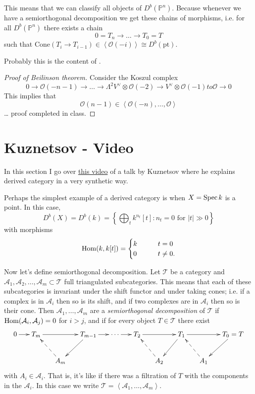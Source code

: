 This means that we can classify all objects
of $D^b(\mathbb{P}^n)$. Because whenever we
have a semiorthogonal decomposition we get
these chains of morphisms, i.e. for all
$D^b(\mathbb{P}^n)$ there exists a chain
$$
0=T_n \to \ldots \to T_0=T
$$
such that $\text{Cone}(T_i \to T_{i-1}) \in
\left\langle{}\mathcal{O}(-i)\right\rangle{} \cong
D^b(\text{pt})$.

Probably this is the content of
\cite{Beilinson-derived}.

\begin{proof}[Proof of Beilinson theorem]
Consider the Koszul complex
$$
0\to \mathcal{O}(-n-1)\to\ldots \to
\Lambda^{2}V^\vee \otimes \mathcal{O}(-2)
\to V^{\vee}\otimes \mathcal{O}(-1) to
\mathcal{O} \to0
$$
This implies that
$$
\mathcal{O}(n-1) \in \left\langle{}
\mathcal{O}(-n),\ldots,\mathcal{O}\right\rangle{}
$$
\ldots{} proof completed in class.
\end{proof}

\section{Kuznetsov - Video}
\label{section-video}

\noindent
In this section I go over
\href{https://www.mathnet.ru/php/
presentation.phtml?option_lang=eng&presentid=
337}{this
video} of a talk by Kuznetsov where he
explains derived category in a very synthetic
way.

\begin{example}
\label{example-simplest-derived-category}
Perhaps the simplest example of a derived
category is when $X=\mathop{\mathrm{Spec}} k$ is a point. In
this case,
$$
D^b(X)=D^b(k)=\left\{\bigoplus_tk^{n_t}[t]:
n_t=0\text{ for }|t|\gg 0\right\}
$$
with morphisms
$$
\mathop{\mathrm{Hom}}\nolimits(k,k[t])
=\begin{cases}
k\qquad &t=0 \\
0\qquad &t\neq 0.
\end{cases}
$$
\end{example}

\noindent
Now let's define semiorthogonal
decomposition. Let $\mathcal{T}$ be a
category and
$\mathcal{A}_1,\mathcal{A}_2,\ldots,
\mathcal{A}_m
\subset \mathcal{T}$ full triangulated
subcategories. This means that each of these
subcategories is invariant under the shift
functor and under taking cones; i.e. if a
complex is in $\mathcal{A}_i$ then so is its
shift, and if two complexes are in
$\mathcal{A}_i$ then so is their cone. Then
$\mathcal{A}_1,\ldots,\mathcal{A}_m$ are a
{\it semiorthogonal decomposition} of
$\mathcal{T}$ if
$\mathop{\mathrm{Hom}}\nolimits(\mathcal{A}_i,\mathcal{A}_j)=0$ for
$i>j$, and if for every object $T \in
\mathcal{T}$ there exist
$$
\xymatrix@C=1.5em{
0\ar[r]&T_m\ar[rr]&&\ar[dl]T_{m-1}\ar[r]
&\cdots\ar[r]&
T_2\ar[rr]&&\ar[dl]T_1\ar[rr]&&\ar[dl]T_0=T\\
&&A_m
\ar@{-->}[ul]&&&&A_2\ar@{-->}[ul]&&
A_1\ar@{-->}[ul]
}
$$
with $A_i \in \mathcal{A}_i$. That is, it's
like if there was a filtration of $T$ with
the components in the $\mathcal{A}_i$. In
this case we write
$\mathcal{T}=\left\langle{}\mathcal{A}_1,\ldots,
\mathcal{A}_m\right\rangle{}$.

